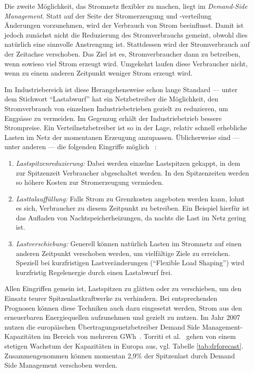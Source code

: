 \documentclass[12pt,BCOR=8.5mm]{scrartcl}
\begin{document}
Die zweite Möglichkeit, das Stromnetz flexibler zu machen, liegt im \emph{Demand-Side
Management}. Statt auf der Seite der Stromerzeugung und -verteilung
Änderungen vorzunehmen, wird der Verbrauch von Strom beeinflusst. Damit
ist jedoch zunächst nicht die Reduzierung des Stromverbrauchs gemeint,
obwohl dies natürlich eine sinnvolle Anstrengung ist. Stattdessen wird
der Stromverbrauch auf der Zeitachse verschoben. Das Ziel ist es,
Stromverbraucher dann zu betreiben, wenn sowieso viel Strom erzeugt
wird. Umgekehrt laufen diese Verbraucher nicht, wenn zu einem anderen
Zeitpunkt weniger Strom erzeugt wird.

Im Industriebereich ist diese Herangehensweise schon lange Standard ---
unter dem Stichwort "`Lastabwurf"' hat ein Netzbetreiber die
Möglichkeit, den Stromverbrauch von einzelnen Industriebetrieben gezielt
zu reduzieren, um Engpässe zu vermeiden. Im Gegenzug erhält der
Industriebetrieb bessere Strompreise. Ein Verteilnetzbetreiber ist so in der
Lage, relativ schnell erhebliche Lasten im Netz der momentanen Erzeugung
anzupassen. Üblicherweise sind --- unter anderen --- die folgenden Eingriffe möglich
\cite[S. 23f]{wiechmann08lastmanagement}~\cite[S. 85ff]{bmwi06eenergy}:

\begin{enumerate}
  \item \emph{Lastspitzenreduzierung:} Dabei werden einzelne Lastspitzen
    gekappt, in dem zur Spitzenzeit Verbraucher abgeschaltet werden. In
    den Spitzenzeiten werden so höhere Kosten zur Stromerzeugung
    vermieden.
  \item \emph{Lasttalauffüllung:} Falls Strom zu Grenzkosten angeboten
    werden kann, lohnt es sich, Verbraucher zu diesem Zeitpunkt zu
    betreiben. Ein Beispiel hierfür ist das Aufladen von
    Nachtspeicherheizungen, da nachts die Last im Netz gering ist.
  \item \emph{Lastverschiebung:} Generell können natürlich Lasten im
    Stromnetz auf einen anderen Zeitpunkt verschoben werden, um
    vielfältige Ziele zu erreichen. Speziell bei kurzfristigen
    Lastveränderungen ("`Flexible Load Shaping"') wird kurzfristig
    Regelenergie durch einen Lastabwurf frei.
\end{enumerate}

Allen Eingriffen gemein ist, Lastspitzen zu glätten oder zu verschieben,
um den Einsatz teurer Spitzenlastkraftwerke zu verhindern. Bei
entsprechenden Prognosen können diese Techniken auch dazu eingesetzt
werden, Strom aus den erneuerbaren Energiequellen aufzunehmen und
gezielt zu nutzen. Im Jahr 2007 nutzen die europäischen
Übertragungsnetzbetreiber Demand Side Management-Kapazitäten im Bereich von
mehreren GWh~\cite{etso07demand}. Torriti et al.~\cite{torriti10demand}
gehen von einem stetigen Wachstum der Kapazitäten in Europa aus, vgl.
Tabelle \ref{tab:drforecast}. Zusammengenommen können momentan 2,9\% der
Spitzenlast durch Demand Side Management verschoben werden.
\end{document}
